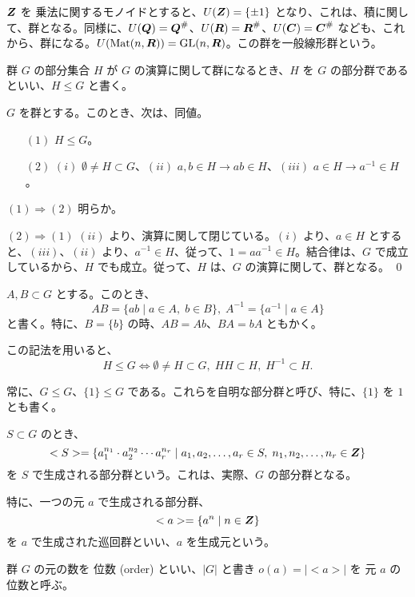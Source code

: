 \begin{eg}
$\mbox{\boldmath $Z$}$ を 乗法に関するモノイドとすると、$U(\mbox{\boldmath $Z$}) = \{\pm 1\}$ となり、これは、積に関して、群となる。同様に、$U(\mbox{\boldmath $Q$}) = \mbox{\boldmath $Q$}^{\#}$、$U(\mbox{\boldmath $R$}) = \mbox{\boldmath $R$}^{\#}$、$U(\mbox{\boldmath $C$}) = \mbox{\boldmath $C$}^{\#}$ なども、これから、群になる。$U(\mbox{{\rm Mat}}(n,\mbox{\boldmath $R$})) = \mbox{{\rm GL}}(n,\mbox{\boldmath $R$})$。この群を一般線形群という。
\end{eg}

\newpage
{}
\begin{definition}
群 $G$  の部分集合 $H$ が $G$ の演算に関して群になるとき、$H$ を $G$ の部分群であるといい、$H \leq G$ と書く。
\end{definition}

\begin{prop} \label{prop:subgroup}
$G$ を群とする。このとき、次は、同値。
\begin{itemize}
\item[$(1)$] $H \leq G$。
\item[$(2)$] $(i)$ $\emptyset \neq H \subset G$、$(ii)$ $a, b\in H \to ab\in H$、$(iii)$ $a\in H\to a^{-1}\in H$。
\end{itemize}
\end{prop}
\proof
$(1)\Rightarrow (2)$ 明らか。

$(2)\Rightarrow (1)$ $(ii)$ より、演算に関して閉じている。$(i)$ より、$a\in H$ とすると、$(iii)$、$(ii)$ より、$a^{-1}\in H$、従って、$1 = aa^{-1}\in H$。結合律は、$G$ で成立しているから、$H$ でも成立。従って、$H$ は、$G$ の演算に関して、群となる。
\qed

\medskip
$A, B\subset G$ とする。このとき、
$$AB = \{ab\mid a\in A, \;b\in B\}, \; A^{-1} = \{a^{-1}\mid a\in A\}$$
と書く。特に、$B = \{b\}$ の時、$AB = Ab$、$BA = bA$ ともかく。

\medskip
この記法を用いると、
$$H \leq G \Leftrightarrow \emptyset \neq H \subset G,\; HH\subset H, \;H^{-1} \subset H.$$

\medskip
常に、$G\leq G$、$\{1\}\leq G$ である。これらを自明な部分群と呼び、特に、$\{1\}$ を $1$ とも書く。

\medskip
$S \subset G$ のとき、
$$<S> = \{a_1^{n_1}\cdot a_2^{n_2}\cdots a_r^{n_r}\mid a_1, a_2, \ldots, a_r\in S, \;n_1, n_2, \ldots, n_r\in \mbox{\boldmath $Z$}\}$$
を $S$ で生成される部分群という。これは、実際、$G$ の部分群となる。

\smallskip
特に、一つの元 $a$ で生成される部分群、
$$<a> = \{ a^n \mid n\in \mbox{\boldmath $Z$}\}$$
を $a$ で生成された巡回群といい、$a$ を生成元という。

\medskip
群 $G$ の元の数を 位数 (order) といい、$|G|$ と書き $o(a) = |<a>|$ を 元 $a$ の位数と呼ぶ。

